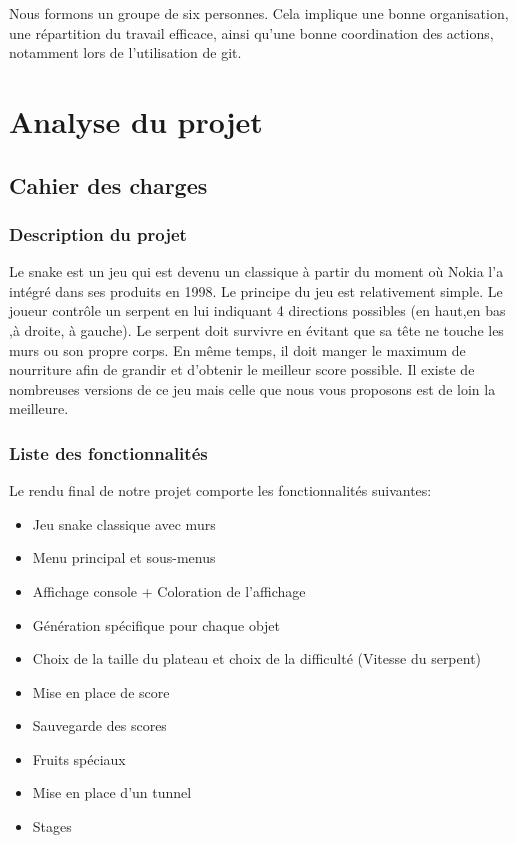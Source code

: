 \documentclass[11pt,a4paper]{article}
\begin{document}
  Nous formons un groupe de six personnes. Cela implique une bonne organisation, une répartition du travail efficace, ainsi qu'une bonne coordination des actions, notamment lors de l'utilisation de git. 

\clearpage %

\section{Analyse du projet}
    
    \subsection{Cahier des charges}
        \subsubsection{Description du projet}
        
            Le snake est un jeu qui est devenu un classique à partir du moment où Nokia l'a intégré dans ses produits en 1998. Le principe du jeu est relativement simple. Le joueur contrôle un serpent en lui indiquant 4 directions possibles (en haut,en bas ,à droite, à gauche). Le serpent doit survivre en évitant que sa tête ne touche les murs ou son propre corps. En même temps, il doit manger le maximum de nourriture afin de grandir et d'obtenir le meilleur score possible. Il existe de nombreuses versions de ce jeu mais celle que nous vous proposons est de loin la meilleure.
            
        \subsubsection{Liste des fonctionnalités}\label{sssect:fonctionnalites}
        
            Le rendu final de notre projet comporte les fonctionnalités suivantes:\\
            
            \begin{itemize}
                \item Jeu snake classique avec murs 
                \item Menu principal et sous-menus 
                \item Affichage console + Coloration de l'affichage
                \item Génération spécifique pour chaque objet
                \item Choix de la taille du plateau et choix de la difficulté (Vitesse du serpent)
                \item Mise en place de score
                \item Sauvegarde des scores
                \item Fruits spéciaux 
                \item Mise en place d'un tunnel 
                \item Stages
            \end{itemize}
            
\end{document}
